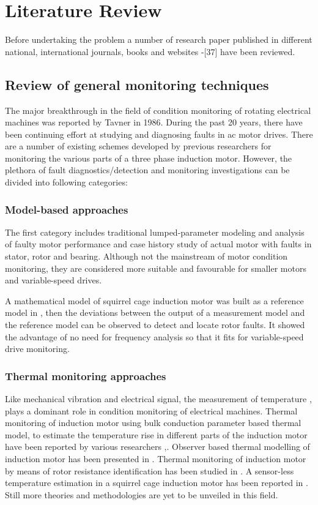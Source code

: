 \documentclass[a4paper,11pt]{report}
\begin{document}
\chapter{Literature Review}
Before undertaking the problem a number of research paper published in different national, international journals, books and websites \cite{Penman}-[37] have been reviewed.

\section{Review of general monitoring techniques} \label{lit1}
The major breakthrough in the field of condition monitoring of rotating electrical machines was reported by Tavner \cite{rps1} in 1986. During the past 20 years, there have been continuing effort at studying and diagnosing faults in ac motor drives. There are a number of existing schemes developed by previous researchers for monitoring the various parts of a three phase induction motor. However, the plethora of fault diagnostics/detection and monitoring investigations can be divided into following categories: 

\subsection*{Model-based approaches}
The first category includes traditional lumped-parameter modeling and analysis of faulty motor performance and case history study of actual motor with faults in stator, rotor and bearing. Although not the mainstream of motor condition monitoring, they are considered more suitable and favourable for smaller motors and variable-speed drives.

A mathematical model of squirrel cage induction motor was built as a reference model in \cite{70}, then the deviations between the output of a measurement model and the reference model can be observed to detect and locate rotor faults. It showed the advantage of no need for frequency analysis so that it fits for variable-speed drive monitoring.

\subsection*{Thermal monitoring approaches}
Like mechanical vibration and electrical signal, the measurement of temperature \cite{rps2},\cite{rps3} plays a dominant role in condition monitoring of electrical machines. Thermal monitoring of induction motor using bulk conduction parameter based thermal model, to estimate the temperature rise in different parts of the induction motor have been reported by various researchers \cite{rps3},\cite{rps17}. Observer based thermal modelling of induction motor has been presented in \cite{rps19}. Thermal monitoring of induction motor by means of rotor resistance identification has been studied in \cite{rps28}. A sensor-less temperature estimation in a squirrel cage induction motor has been reported in \cite{rps27}. Still more theories and methodologies are yet to be unveiled in this field.
\end{document}
